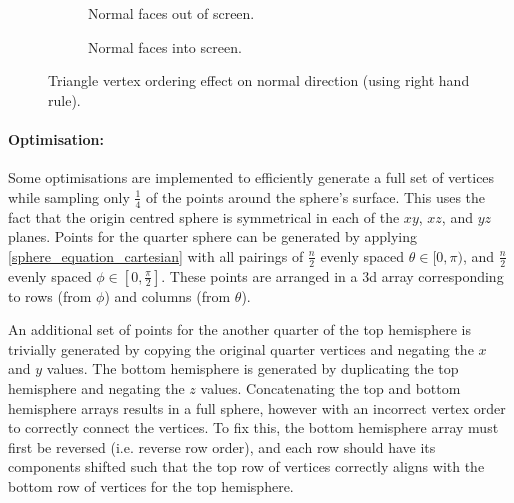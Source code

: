 \begin{figure}
  \begin{center}
    \begin{subfigure}{0.4\textwidth}
      
      \caption{Normal faces out of screen.}
      \label{fig:out_normal}
    \end{subfigure}
        \begin{subfigure}{0.4\textwidth}
      
      \caption{Normal faces into screen.}
      \label{fig:in_normal}
    \end{subfigure}
  \end{center}
  \caption{Triangle vertex ordering effect on normal direction (using right hand rule).}
  \label{fig:triangle}
\end{figure}

\paragraph{Optimisation:} Some optimisations are implemented to efficiently generate a full set of vertices while sampling only $\frac{1}{4}$ of the points around the sphere's surface. This uses the fact that the origin centred sphere is symmetrical in each of the $xy$, $xz$, and $yz$ planes. Points for the quarter sphere can be generated by applying \cref{sphere_equation_cartesian} with all pairings of $\frac{n}{2}$ evenly spaced $\theta \in [0, \pi)$, and $\frac{n}{2}$ evenly spaced $\phi \in [0, \frac{\pi}{2}]$. These points are arranged in a 3d array corresponding to rows (from $\phi$) and columns (from $\theta$).

An additional set of points for the another quarter of the top hemisphere is trivially generated  by copying the original quarter vertices and negating the $x$ and $y$ values. The bottom hemisphere is generated by duplicating the top hemisphere and negating the $z$ values. Concatenating the top and bottom hemisphere arrays results in a full sphere, however with an incorrect vertex order to correctly connect the vertices. To fix this, the bottom hemisphere array must first be reversed (i.e. reverse row order), and each row should have its components shifted such that the top row of vertices correctly aligns with the bottom row of vertices for the top hemisphere.

